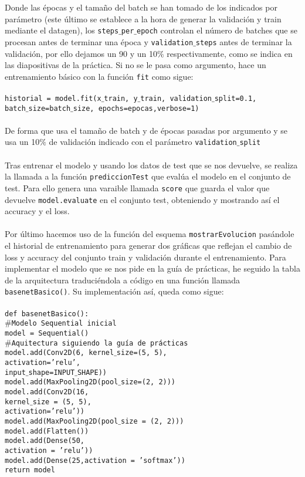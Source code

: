 \documentclass[12pt]{article}
\begin{document}
Donde las épocas y el tamaño del batch se han tomado de los indicados por parámetro (este último se establece a la hora de generar la validación y train mediante el datagen), los \texttt{steps$\_$per$\_$epoch} controlan el número de batches que se procesan antes de terminar una época y \texttt{validation$\_$steps} antes de terminar la validación, por ello dejamos un 90 y un 10$\%$ respectivamente, como se indica en las diapositivas de la práctica.
Si no se le pasa como argumento, hace un entrenamiento básico con la función \texttt{fit} como sigue:\\\\
\texttt{historial = model.fit(x$\_$train, y$\_$train, validation$\_$split=0.1,\\
batch$\_$size=batch$\_$size, epochs=epocas,verbose=1)}\\\\
De forma que usa el tamaño de batch y de épocas pasadas por argumento y se usa un 10$\%$ de validación indicado con el parámetro \texttt{validation$\_$split}\\\\
Tras entrenar el modelo y usando los datos de test que se nos devuelve, se realiza la llamada a la función \texttt{prediccionTest} que evalúa el modelo en el conjunto de test. Para ello genera una varaible llamada \texttt{score} que guarda el valor que devuelve \texttt{model.evaluate} en el conjunto test, obteniendo y mostrando así el accuracy y el loss.\\\\
Por último hacemos uso de la función del esquema \texttt{mostrarEvolucion} pasándole el historial de entrenamiento para generar dos gráficas que reflejan el cambio de loss y accuracy del conjunto train y validación durante el entrenamiento. Para implementar el modelo que se nos pide en la guía de prácticas, he seguido la tabla de la arquitectura traduciéndola a código en una función llamada \texttt{basenetBasico()}. Su implementación así, queda como sigue:\\\\
\texttt{def basenetBasico():\\
$\#$Modelo Sequential inicial\\
model = Sequential()\\
$\#$Aquitectura siguiendo la guía de prácticas\\
model.add(Conv2D(6, kernel$\_$size=(5, 5),\\
activation='relu',\\
input$\_$shape=INPUT$\_$SHAPE))\\
model.add(MaxPooling2D(pool$\_$size=(2, 2)))\\
model.add(Conv2D(16,\\
kernel$\_$size = (5, 5),\\
activation='relu'))\\
model.add(MaxPooling2D(pool$\_$size = (2, 2)))\\
model.add(Flatten())\\
model.add(Dense(50,\\
activation = 'relu'))\\
model.add(Dense(25,activation = 'softmax'))\\
return model}\\
\end{document}
